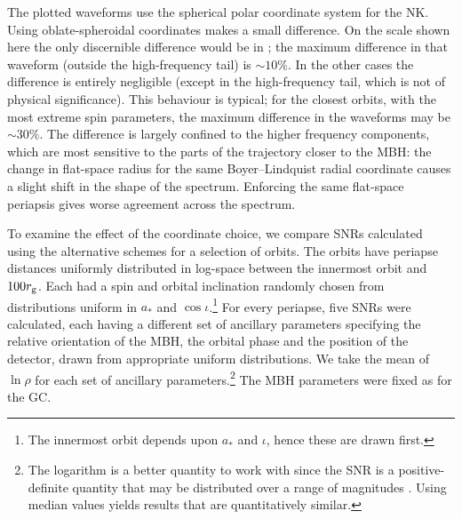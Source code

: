 The plotted waveforms use the spherical polar coordinate system for the NK. Using oblate-spheroidal coordinates makes a small difference. On the scale shown here the only discernible difference would be in ; the maximum difference in that waveform (outside the high-frequency tail) is $\sim 10\%$. In the other cases the difference is entirely negligible (except in the high-frequency tail, which is not of physical significance). This behaviour is typical; for the closest orbits, with the most extreme spin parameters, the maximum difference in the waveforms may be $\sim 30\%$. The difference is largely confined to the higher frequency components, which are most sensitive to the parts of the trajectory closer to the MBH: the change in flat-space radius for the same Boyer--Lindquist radial coordinate causes a slight shift in the shape of the spectrum. Enforcing the same flat-space periapsis gives worse agreement across the spectrum.

To examine the effect of the coordinate choice, we compare SNRs calculated using the alternative schemes for a selection of orbits. The orbits have periapse distances uniformly distributed in log-space between the innermost orbit and $100 r_\mathrm{g}$. Each had a spin and orbital inclination randomly chosen from distributions uniform in $a_\ast$ and $\cos \iota$.\footnote{The innermost orbit depends upon $a_\ast$ and $\iota$, hence these are drawn first.} For every periapse, five SNRs were calculated, each having a different set of ancillary parameters specifying the relative orientation of the MBH, the orbital phase and the position of the detector, drawn from appropriate uniform distributions. We take the mean of $\ln \rho$ for each set of ancillary parameters.\footnote{The logarithm is a better quantity to work with since the SNR is a positive-definite quantity that may be distributed over a range of magnitudes \citep[sections 22.1, 23.3]{MacKay2003}. Using median values yields results that are quantitatively similar.} The MBH parameters were fixed as for the GC.

